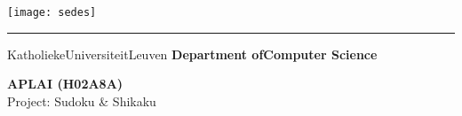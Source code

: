 \begin{titlepage}
    \newpage
    \thispagestyle{empty}
    \frenchspacing
    \hspace{-0.2cm}
    \texttt{[image: sedes]}
    \hspace{0.2cm}
    \rule{0.5pt}{3.4cm}
    \hspace{0.2cm}
    \begin{minipage}[b]{8cm}
        \Large{Katholieke\newline Universiteit\newline Leuven}\smallskip\newline
        \large{}\smallskip\newline
        \textbf{Department of\newline Computer Science}\smallskip
    \end{minipage}
    \vspace*{3.2cm}\vfill
    \begin{center}
        \begin{minipage}[t]{\textwidth}
            \begin{center}
                \LARGE{\rm{\textbf{\uppercase{APLAI (H02A8a)}}}}\\
                \Large{\rm{Project: Sudoku \& Shikaku}}
            \end{center}
        \end{minipage}
    \end{center}
    \vfill
    \hfill{}
\end{titlepage}
